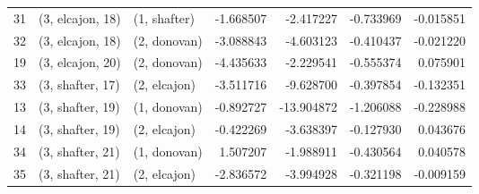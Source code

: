 \begin{tabular}{lllrrrr}
31 &  (3, elcajon, 18) &     (1, shafter) &  -1.668507 &  -2.417227 &  -0.733969 & -0.015851 \\
32 &  (3, elcajon, 18) &     (2, donovan) &  -3.088843 &  -4.603123 &  -0.410437 & -0.021220 \\
19 &  (3, elcajon, 20) &     (2, donovan) &  -4.435633 &  -2.229541 &  -0.555374 &  0.075901 \\
33 &  (3, shafter, 17) &     (2, elcajon) &  -3.511716 &  -9.628700 &  -0.397854 & -0.132351 \\
13 &  (3, shafter, 19) &     (1, donovan) &  -0.892727 & -13.904872 &  -1.206088 & -0.228988 \\
14 &  (3, shafter, 19) &     (2, elcajon) &  -0.422269 &  -3.638397 &  -0.127930 &  0.043676 \\
34 &  (3, shafter, 21) &     (1, donovan) &   1.507207 &  -1.988911 &  -0.430564 &  0.040578 \\
35 &  (3, shafter, 21) &     (2, elcajon) &  -2.836572 &  -3.994928 &  -0.321198 & -0.009159 \\
\bottomrule
\end{tabular}
